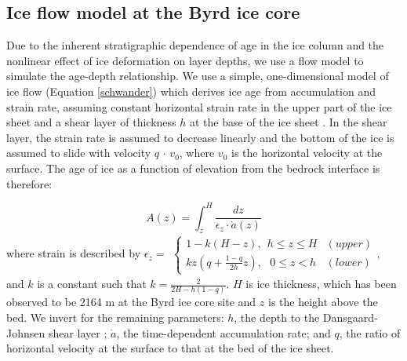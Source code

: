 \subsection{Ice flow model at the Byrd ice core}

Due to the inherent stratigraphic dependence of age in the ice column and the nonlinear effect of ice deformation on layer depths, we use a flow model to simulate the age-depth relationship. We use a simple, one-dimensional model of ice flow (Equation \ref{schwander}) which derives ice age from accumulation and strain rate, assuming constant horizontal strain rate in the upper part of the ice sheet and a shear layer of thickness $h$ at the base of the ice sheet \citep{schwander2001}. In the shear layer, the strain rate is assumed to decrease linearly and the bottom of the ice is assumed to slide with velocity $q$ $\cdot$ $v_0$, where $v_0$ is the horizontal velocity at the surface. The age of ice as a function of elevation from the bedrock interface is therefore:

\begin{equation}\label{schwander}
A(z) = \int_{z}^{H} \frac{dz}{\epsilon_z \cdot \dot{a}(z)}
\end{equation}
where strain is described by
$    \epsilon_z=
	\begin{aligned}
    \begin{cases}
                 1-k(H-z), \:\:  h \leq z \leq H  & (upper) \\
                  kz(q+\frac{1-q}{2h}z), \:\:\: 0 \leq z < h &(lower)
    \end{cases}, 
    \end{aligned}
$
and $k$ is a constant such that $k = \frac{2}{2H - h(1-q)}$. $H$ is ice thickness, which has been observed to be 2164 m at the Byrd ice core site \citep{gow1968} and $z$ is the height above the bed. We invert for the remaining parameters: $h$, the depth to the Dansgaard-Johnsen shear layer \citep{dansgaardjohnsen1969}; $\dot{a}$, the time-dependent accumulation rate; and $q$, the ratio of horizontal velocity at the surface to that at the bed of the ice sheet.

